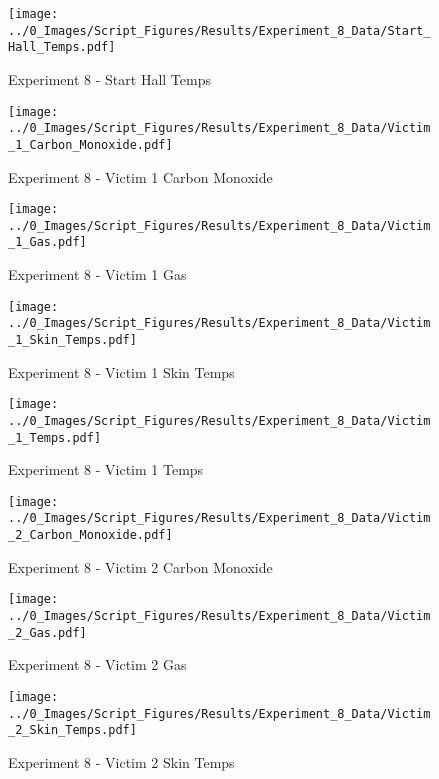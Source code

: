 	\begin{figure}[H]
		\centering
		\texttt{[image: ../0\_Images/Script\_Figures/Results/Experiment\_8\_Data/Start\_Hall\_Temps.pdf]}
		\caption[]{Experiment 8 - Start Hall Temps}
	\end{figure}
 
	\clearpage

	\begin{figure}[H]
		\centering
		\texttt{[image: ../0\_Images/Script\_Figures/Results/Experiment\_8\_Data/Victim\_1\_Carbon\_Monoxide.pdf]}
		\caption[]{Experiment 8 - Victim 1 Carbon Monoxide}
	\end{figure}
 

	\begin{figure}[H]
		\centering
		\texttt{[image: ../0\_Images/Script\_Figures/Results/Experiment\_8\_Data/Victim\_1\_Gas.pdf]}
		\caption[]{Experiment 8 - Victim 1 Gas}
	\end{figure}
 
	\clearpage

	\begin{figure}[H]
		\centering
		\texttt{[image: ../0\_Images/Script\_Figures/Results/Experiment\_8\_Data/Victim\_1\_Skin\_Temps.pdf]}
		\caption[]{Experiment 8 - Victim 1 Skin Temps}
	\end{figure}
 

	\begin{figure}[H]
		\centering
		\texttt{[image: ../0\_Images/Script\_Figures/Results/Experiment\_8\_Data/Victim\_1\_Temps.pdf]}
		\caption[]{Experiment 8 - Victim 1 Temps}
	\end{figure}
 
	\clearpage

	\begin{figure}[H]
		\centering
		\texttt{[image: ../0\_Images/Script\_Figures/Results/Experiment\_8\_Data/Victim\_2\_Carbon\_Monoxide.pdf]}
		\caption[]{Experiment 8 - Victim 2 Carbon Monoxide}
	\end{figure}
 

	\begin{figure}[H]
		\centering
		\texttt{[image: ../0\_Images/Script\_Figures/Results/Experiment\_8\_Data/Victim\_2\_Gas.pdf]}
		\caption[]{Experiment 8 - Victim 2 Gas}
	\end{figure}
 
	\clearpage

	\begin{figure}[H]
		\centering
		\texttt{[image: ../0\_Images/Script\_Figures/Results/Experiment\_8\_Data/Victim\_2\_Skin\_Temps.pdf]}
		\caption[]{Experiment 8 - Victim 2 Skin Temps}
	\end{figure}
 

